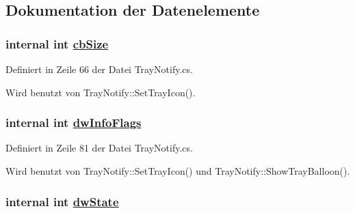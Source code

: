 \subsection{Dokumentation der Datenelemente}
\hypertarget{structQbeTray_1_1TrayNotify_1_1NOTIFYICONDATA_QbeTray_1_1TrayNotify_1_1NOTIFYICONDATAo0}{
\subsubsection[cbSize]{\setlength{\rightskip}{0pt plus 5cm}internal int \hyperlink{structQbeTray_1_1TrayNotify_1_1NOTIFYICONDATA_QbeTray_1_1TrayNotify_1_1NOTIFYICONDATAo0}{cb\-Size}}}
\label{structQbeTray_1_1TrayNotify_1_1NOTIFYICONDATA_QbeTray_1_1TrayNotify_1_1NOTIFYICONDATAo0}




Definiert in Zeile 66 der Datei Tray\-Notify.cs.

Wird benutzt von Tray\-Notify::Set\-Tray\-Icon().\hypertarget{structQbeTray_1_1TrayNotify_1_1NOTIFYICONDATA_QbeTray_1_1TrayNotify_1_1NOTIFYICONDATAo12}{
\subsubsection[dwInfoFlags]{\setlength{\rightskip}{0pt plus 5cm}internal int \hyperlink{structQbeTray_1_1TrayNotify_1_1NOTIFYICONDATA_QbeTray_1_1TrayNotify_1_1NOTIFYICONDATAo12}{dw\-Info\-Flags}}}
\label{structQbeTray_1_1TrayNotify_1_1NOTIFYICONDATA_QbeTray_1_1TrayNotify_1_1NOTIFYICONDATAo12}




Definiert in Zeile 81 der Datei Tray\-Notify.cs.

Wird benutzt von Tray\-Notify::Set\-Tray\-Icon() und Tray\-Notify::Show\-Tray\-Balloon().\hypertarget{structQbeTray_1_1TrayNotify_1_1NOTIFYICONDATA_QbeTray_1_1TrayNotify_1_1NOTIFYICONDATAo7}{
\subsubsection[dwState]{\setlength{\rightskip}{0pt plus 5cm}internal int \hyperlink{structQbeTray_1_1TrayNotify_1_1NOTIFYICONDATA_QbeTray_1_1TrayNotify_1_1NOTIFYICONDATAo7}{dw\-State}}}
\label{structQbeTray_1_1TrayNotify_1_1NOTIFYICONDATA_QbeTray_1_1TrayNotify_1_1NOTIFYICONDATAo7}




